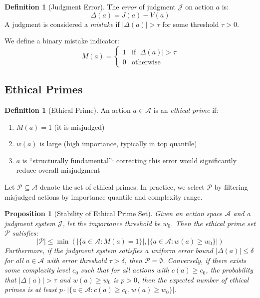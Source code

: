 \documentclass[12pt,a4paper]{article}
\newtheorem{proposition}[theorem]{Proposition}
\theoremstyle{definition}
\newtheorem{definition}[theorem]{Definition}
\theoremstyle{remark}
\begin{document}
\begin{definition}[Judgment Error]
The \emph{error} of judgment $\mathcal{J}$ on action $a$ is:
\[
\Delta(a) = J(a) - V(a)
\]
A judgment is considered a \emph{mistake} if $|\Delta(a)| > \tau$ for some threshold $\tau > 0$.
\end{definition}

We define a binary mistake indicator:
\[
M(a) = \begin{cases}
1 & \text{if } |\Delta(a)| > \tau \\
0 & \text{otherwise}
\end{cases}
\]

\subsection{Ethical Primes}

\begin{definition}[Ethical Prime]
An action $a \in \mathcal{A}$ is an \emph{ethical prime} if:
\begin{enumerate}
    \item $M(a) = 1$ (it is misjudged)
    \item $w(a)$ is large (high importance, typically in top quantile)
    \item $a$ is ``structurally fundamental'': correcting this error would significantly reduce overall misjudgment
\end{enumerate}
\end{definition}

Let $\mathcal{P} \subseteq \mathcal{A}$ denote the set of ethical primes. In practice, we select $\mathcal{P}$ by filtering misjudged actions by importance quantile and complexity range.

\begin{proposition}[Stability of Ethical Prime Set]
\label{prop:prime_stability}
Given an action space $\mathcal{A}$ and a judgment system $\mathcal{J}$, let the importance threshold be $w_0$. Then the ethical prime set $\mathcal{P}$ satisfies:
\[
|\mathcal{P}| \leq \min\left(|\{a \in \mathcal{A} : M(a) = 1\}|, |\{a \in \mathcal{A} : w(a) \geq w_0\}|\right)
\]
Furthermore, if the judgment system satisfies a uniform error bound $|\Delta(a)| \leq \delta$ for all $a \in \mathcal{A}$ with error threshold $\tau > \delta$, then $\mathcal{P} = \emptyset$. Conversely, if there exists some complexity level $c_0$ such that for all actions with $c(a) \geq c_0$, the probability that $|\Delta(a)| > \tau$ and $w(a) \geq w_0$ is $p > 0$, then the expected number of ethical primes is at least $p \cdot |\{a \in \mathcal{A} : c(a) \geq c_0, w(a) \geq w_0\}|$.
\end{proposition}
\end{document}
